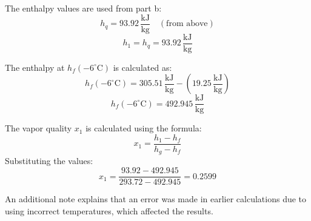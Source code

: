 The enthalpy values are used from part b:  
\[
h_q = 93.92 \, \frac{\text{kJ}}{\text{kg}} \quad (\text{from above})
\]  
\[
h_1 = h_q = 93.92 \, \frac{\text{kJ}}{\text{kg}}
\]  

The enthalpy at \(h_f(-6^\circ\text{C})\) is calculated as:  
\[
h_f(-6^\circ\text{C}) = 305.51 \, \frac{\text{kJ}}{\text{kg}} - (19.25 \, \frac{\text{kJ}}{\text{kg}})
\]  
\[
h_f(-6^\circ\text{C}) = 492.945 \, \frac{\text{kJ}}{\text{kg}}
\]  

The vapor quality \(x_1\) is calculated using the formula:  
\[
x_1 = \frac{h_1 - h_f}{h_g - h_f}
\]  
Substituting the values:  
\[
x_1 = \frac{93.92 - 492.945}{293.72 - 492.945} = 0.2599
\]  

An additional note explains that an error was made in earlier calculations due to using incorrect temperatures, which affected the results.